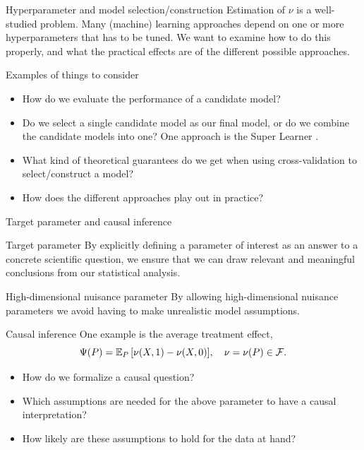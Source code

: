 \documentclass[smaller]{beamer}\usepackage{listings}
\begin{document}
\begin{frame}[label={sec:org9f77f7c}]{Hyperparameter and model selection/construction}
Estimation of \(\nu\) is a well-studied problem. Many (machine) learning approaches depend on one or
more hyperparameters that has to be tuned. We want to examine how to do this properly, and what the
practical effects are of the different possible approaches.

\vfill

\begin{block}{Examples of things to consider}
\begin{itemize}
\item How do we evaluate the performance of a candidate model?
\item Do we select a single candidate model as our final model, or do we combine the candidate models
into one? One approach is the Super Learner \citep{van2011targeted,HoffmanBlog}.
\item What kind of theoretical guarantees do we get when using cross-validation to select/construct a model?
\item How does the different approaches play out in practice?
\end{itemize}
\end{block}
\end{frame}

\begin{frame}[label={sec:org4f946cd}]{Target parameter and causal inference}
\begin{block}{Target parameter}
By explicitly defining a parameter of interest as an answer to a concrete scientific question, we
ensure that we can draw relevant and meaningful conclusions from our statistical analysis.
\end{block}

\begin{block}{High-dimensional nuisance parameter}
By allowing high-dimensional nuisance parameters we avoid having to make unrealistic model
assumptions.
\end{block}

\begin{block}{Causal inference}
One example is the average treatment effect, \[\Psi(P) = \operatorname{\mathbb{E}}_P{[\nu(X, 1) -\nu(X, 0)]}, \quad
\nu=\nu(P) \in \mathcal{F}. \]

\begin{itemize}
\item How do we formalize a causal question?
\item Which assumptions are needed for the above parameter to have a causal interpretation?
\item How likely are these assumptions to hold for the data at hand?
\end{itemize}
\end{block}
\end{frame}
\end{document}
